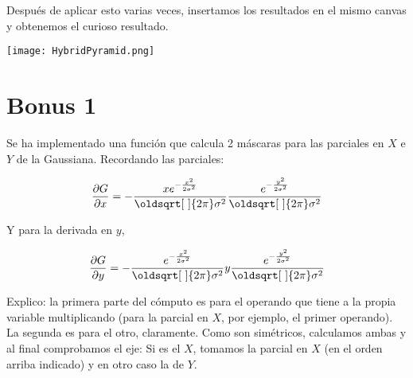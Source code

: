 \documentclass[a4paper, 11pt]{article}
\theoremstyle{definition}
\renewcommand*{\sqrt}[2][\ ]{\oldsqrt[#1]{#2} }
\begin{document}
  Después de aplicar esto varias veces, insertamos los resultados
  en el mismo canvas y obtenemos el curioso resultado.

  \centerline{\texttt{[image: HybridPyramid.png]}}

  \section{Bonus 1}

  Se ha implementado una función que calcula 2 máscaras para las parciales en $X$ e $Y$
  de la Gaussiana. Recordando las parciales:

  \[
   \frac{\partial G}{\partial x} = - \frac{x e^{- \frac{x^{2}}{2 \sigma^{2}}}}{\sqrt{2 \pi} \sigma^{2}} \frac{e^{- \frac{y^{2}}{2 \sigma^{2}}}}{\sqrt{2 \pi} \sigma^{2}}
  \]

  Y para la derivada en $y$,

  \[
   \frac{\partial G}{\partial y} = - \frac{e^{- \frac{x^{2}}{2 \sigma^{2}}}}{\sqrt{2 \pi} \sigma^{2}} y\frac{e^{- \frac{y^{2}}{2 \sigma^{2}}}}{\sqrt{2 \pi} \sigma^{2}}
  \]

  Explico: la primera parte del cómputo es para el operando que tiene a la propia
  variable multiplicando (para la parcial en $X$, por ejemplo, el primer operando).
  La segunda es para el otro, claramente. Como son simétricos, calculamos ambas
  y al final comprobamos el eje: Si es el $X$, tomamos la parcial en $X$ (en el orden
  arriba indicado) y en otro caso la de $Y$.
\end{document}
